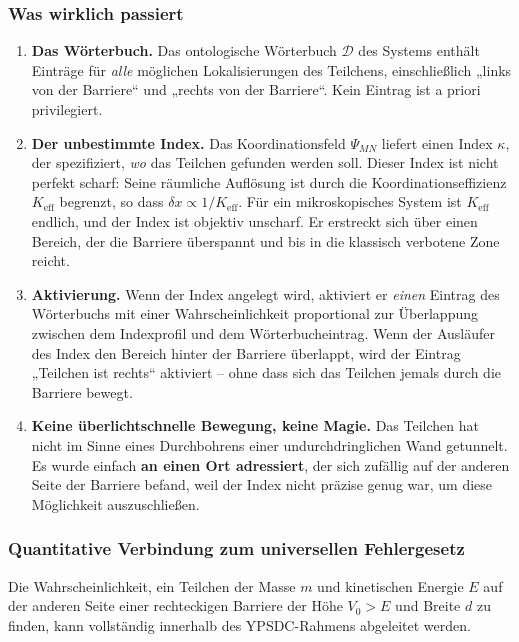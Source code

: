 \documentclass[12pt,a4paper]{article}
\theoremstyle{remark}
\begin{document}
	\subsubsection{Was wirklich passiert}
	
	\begin{enumerate}[leftmargin=*]
		\item \textbf{Das Wörterbuch.}
		Das ontologische Wörterbuch $\mathcal{D}$ des Systems enthält Einträge für \emph{alle} möglichen Lokalisierungen des Teilchens, einschließlich „links von der Barriere“ und „rechts von der Barriere“. Kein Eintrag ist a priori privilegiert.
		
		\item \textbf{Der unbestimmte Index.}
		Das Koordinationsfeld $\Psi_{MN}$ liefert einen Index $\kappa$, der spezifiziert, \emph{wo} das Teilchen gefunden werden soll. Dieser Index ist nicht perfekt scharf: Seine räumliche Auflösung ist durch die Koordinationseffizienz $K_{\mathrm{eff}}$ begrenzt, so dass $\delta x \propto 1/K_{\mathrm{eff}}$. Für ein mikroskopisches System ist $K_{\mathrm{eff}}$ endlich, und der Index ist objektiv unscharf. Er erstreckt sich über einen Bereich, der die Barriere überspannt und bis in die klassisch verbotene Zone reicht.
		
		\item \textbf{Aktivierung.}
		Wenn der Index angelegt wird, aktiviert er \emph{einen} Eintrag des Wörterbuchs mit einer Wahrscheinlichkeit proportional zur Überlappung zwischen dem Indexprofil und dem Wörterbucheintrag. Wenn der Ausläufer des Index den Bereich hinter der Barriere überlappt, wird der Eintrag „Teilchen ist rechts“ aktiviert – ohne dass sich das Teilchen jemals durch die Barriere bewegt.
		
		\item \textbf{Keine überlichtschnelle Bewegung, keine Magie.}
		Das Teilchen hat nicht im Sinne eines Durchbohrens einer undurchdringlichen Wand getunnelt. Es wurde einfach \textbf{an einen Ort adressiert}, der sich zufällig auf der anderen Seite der Barriere befand, weil der Index nicht präzise genug war, um diese Möglichkeit auszuschließen.
	\end{enumerate}
	
	\subsubsection{Quantitative Verbindung zum universellen Fehlergesetz}
	
	Die Wahrscheinlichkeit, ein Teilchen der Masse $m$ und kinetischen Energie $E$ auf der anderen Seite einer rechteckigen Barriere der Höhe $V_0>E$ und Breite $d$ zu finden, kann vollständig innerhalb des YPSDC-Rahmens abgeleitet werden.
	
\end{document}
